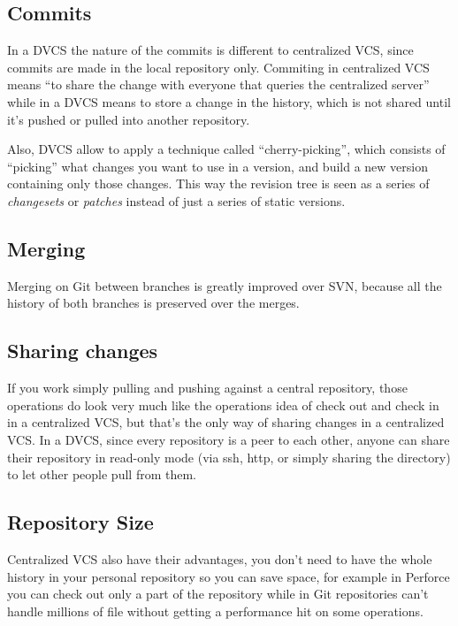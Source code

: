 \subsection{Commits}
In a DVCS the nature of the commits is different to centralized VCS, since commits are made in the local repository only. 
Commiting in centralized VCS means ``to share the change with everyone that queries the centralized server'' while in a 
DVCS means to store a change in the history, which is not shared until it's pushed or pulled into another repository.

Also, DVCS allow to apply a technique called ``cherry-picking'', 
which consists of ``picking'' what changes you want to use in a version, and build 
a new version containing only those changes. This way the revision tree is seen as a 
series of \emph{changesets} or \emph{patches} instead of just a series of static versions.

\subsection{Merging}
Merging on Git between branches is greatly improved over SVN, because all the history of 
both branches is preserved over the merges. %

\subsection{Sharing changes}
If you work simply pulling and pushing against a central repository, those operations do look 
very much like the operations idea of check out and check in in a centralized VCS, 
but that's the only way of sharing changes in a centralized VCS.
In a DVCS, since every repository is a peer to each other, anyone can share their repository in 
read-only mode (via ssh, http, or simply sharing the directory) to let other people pull from them. 

\subsection{Repository Size}

Centralized VCS also have their advantages, you don't need to have the whole history in your 
personal repository so you can save space, for example in Perforce you can check out only a part of the 
repository\cite{perforceclientspec} while in Git repositories can't handle millions of file 
without getting a performance hit on some operations\cite{linusgit}.

